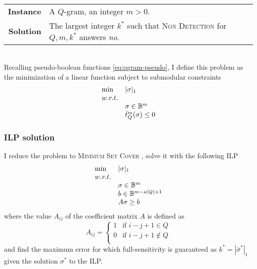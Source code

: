 \paragraph{}
\begin{tabular}{rl}
{\bf Instance}	&	A $Q$-gram, an integer $m > 0$.\\
{\bf Solution}	&	The largest integer $k^*$ such that \textsc{Non Detection} for $Q,m,k^*$ answers \emph{no}.\\
\end{tabular}
\\

Recalling pseudo-boolean functions \ref{eq:qgram-pseudo}, I define this problem as the minimization of a linear function subject to submodular constraints
\begin{equation}
\begin{array}{ll}
\text{min} & |\sigma|_1			\\
w.r.t.								\\
& \sigma \in \mathbb {B}^m					\\
& \bar{t}_{Q}^{m}(\sigma) \leq 0	\\
\end{array}
\end{equation}

\subsubsection{ILP solution}

I reduce the problem to \textsc{Minimum Set Cover} \citep{Vazirani2001}, solve it with the following ILP
\begin{equation}
\begin{array}{ll}
\text{min} & |\sigma|_1	\\
w.r.t.				\\
& \sigma \in \mathbb {B}^m	\\
& b \in \mathbb {B}^{m-s(Q)+1}\\
& A\sigma \geq b	\\
\end{array}
\end{equation}
where the value $A_{ij}$ of the coefficient matrix $A$ is defined as
\begin{equation}
A_{ij} = 
\left\{
	\begin{array}{ll}
		1  & \mbox{if } i-j+1 \in Q		\\
		0  & \mbox{if } i-j+1 \notin Q	\\
	\end{array}
\right.
\end{equation}
and find the maximum error for which full-sensitivity is guaranteed as $k^* = |\bar{\sigma}^*|_1$ given the solution $\sigma^*$ to the ILP.

